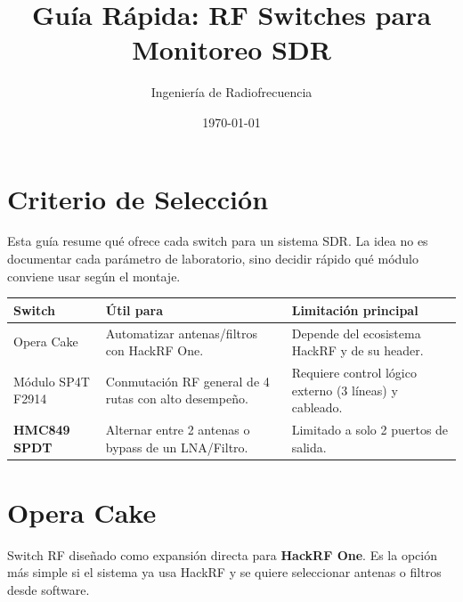 \documentclass[11pt]{article}
\title{Guía Rápida: RF Switches para Monitoreo SDR}
\author{Ingeniería de Radiofrecuencia}
\date{\today}
\begin{document}
\maketitle
\tableofcontents
\newpage

\section{Criterio de Selección}

Esta guía resume qué ofrece cada switch para un sistema SDR. La idea no es documentar cada parámetro de laboratorio, sino decidir rápido qué módulo conviene usar según el montaje.

\begin{table}[h]
    \centering
    \small
    \begin{tabular}{p{}p{}p{}}
        \toprule
        \textbf{Switch} & \textbf{Útil para} & \textbf{Limitación principal} \\
        \midrule
        Opera Cake & Automatizar antenas/filtros con HackRF One. & Depende del ecosistema HackRF y de su header. \\
        Módulo SP4T F2914 & Conmutación RF general de 4 rutas con alto desempeño. & Requiere control lógico externo (3 líneas) y cableado. \\
        \textbf{HMC849 SPDT} & Alternar entre 2 antenas o bypass de un LNA/Filtro. & Limitado a solo 2 puertos de salida. \\
        \bottomrule
    \end{tabular}
\end{table}

\section{Opera Cake}

Switch RF diseñado como expansión directa para \textbf{HackRF One}. Es la opción más simple si el sistema ya usa HackRF y se quiere seleccionar antenas o filtros desde software.
\end{document}

